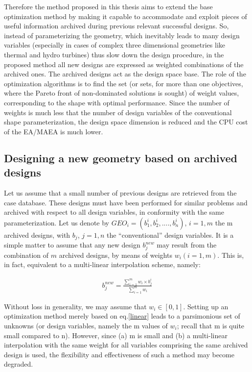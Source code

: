 Therefore the method proposed in this thesis aims to extend the base optimization method by making it capable to accommodate and exploit pieces of useful information archived during previous relevant successful designs. So, instead of parameterizing the geometry, which inevitably leads to many design variables (especially in cases of complex three dimensional geometries like thermal and hydro turbines) thus slow down the design procedure, in the proposed method all new designs are expressed as weighted combinations of the archived ones. The archived designs act as the design space base. The role of the optimization algorithms is to find the set (or sets, for more than one objectives, where the Pareto front of non-dominated solutions is sought) of weight values, corresponding to the shape with optimal performance. Since the number of weights is much less that the number of design variables of the conventional shape parameterization, the design space dimension is reduced and the CPU cost of the EA/MAEA is much lower.

\subsection{Designing a new geometry based on archived designs}
Let us assume that a small number of previous designs are retrieved from the case database. These designs must have been performed for similar problems and archived with respect to all design variables, in conformity with the same parameterization. Let us denote by $GEO_i=(b_1^i,b_2^i,....,b_n^i)$, $i\!=\!1,m$ the m archived designs, with $b_j$, $j=1,n$  the “conventional” design variables. It is a simple matter to assume that any new design $b_j^{new}$ may result from the combination of $m$ archived designs, by means of weights $w_i (i=1,m)$. This is, in fact, equivalent to a multi-linear interpolation scheme, namely:

\begin{eqnarray}
   b_j^{new} = \frac{\sum_{i=1}^{m}w_i \times b_j^i}{\sum_{i=1}^{m}w_i } 
   \label{linear} 
\end{eqnarray}

Without loss in generality, we may assume that $w_i \in [0,1]$. Setting up an optimization method merely based on eq.\ref{linear} leads to a parsimonious set of unknowns (or design variables, namely the m values of $w_i$; recall that m is quite small compared to n). However, since (a) m is small and (b) a multi-linear interpolation with the same weight for all variables comprising the same archived design is used, the flexibility and effectiveness of such a method may become degraded. 

